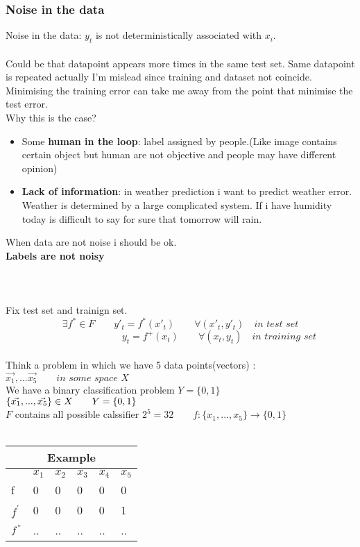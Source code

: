 \documentclass[../main.tex]{subfiles}
\begin{document}
\subsubsection{Noise in the data}

Noise in the data: $y_t$ is not deterministically associated with $x_i$.\\\\
Could be that datapoint appears more times in the same test set.
Same datapoint is repeated actually I’m mislead since training and dataset not
coincide.
Minimising the training error can take me away from the point that minimise
the test error.\\
Why this is the case?
\begin{itemize}
\item Some \textbf{human in the loop}: label assigned by people.(Like image contains
certain object but human are not objective and people may have different
opinion)
\item \textbf{Lack of information}: in weather prediction i want to predict weather error.
Weather is determined by a large complicated system. If i have humidity
today is difficult to say for sure that tomorrow will rain.
\end{itemize}
When data are not noise i should be ok.
\\
\textbf{Labels are not noisy}\\\\\\\\
Fix test set and trainign set.
$$ \exists f^* \in F \qquad y'_t = f^*(x'_t) \qquad \forall (x'_t,y'_t)\quad \textit{in test set} $$
$$ \qquad \qquad \qquad \qquad  y_t = f^+(x_t) \qquad \forall (x_t,y_t) \quad \textit{in training set} 
$$
\\
Think a problem in which we have 5 data points(vectors) :\\
$
\vec{x_1},...\vec{x_5} \qquad \textit{in some space X}
$
\\
We have a binary classification problem $Y = \{0,1\}$
\\
$
\{ \vec{x_1},..., \vec{x_5} \} \in X \qquad Y= \{0,1\}\\
$
\\ $F$ contains all possible calssifier $2^5 = 32 \qquad f: \{x_1,...,x_5\} \rightarrow \{0,1\}
$
\\\\
\begin{tabular}{ |p{2cm}||p{2cm}|p{2cm}|p{2cm}|p{2cm}|p{2cm}|  }
 \hline
 \multicolumn{6}{|c|}{Example} \\
 \hline
  & $x_1$ & $x_2$ & $x_3$ & $x_4$ & $x_5$ \\
 \hline
 f   &0     &0 &   0  & 0& 0 \\
 $f^{'}$  &0     &0 &   0  & 0& 1 \\
 $f^" $ &..     &..&   .. &..& .. \\

 \hline
\end{tabular}
\end{document}
